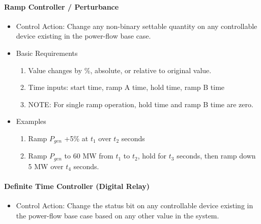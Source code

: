 \documentclass[12pt]{article}
\newcommand{\q}{(\textit{\textbf{?}})}
\begin{document}
\begin{multicols*}{2}
\paragraph{Ramp Controller / Perturbance}
\begin{itemize}
	\item Control Action: Change any non-binary settable quantity on any controllable device existing in the power-flow base case.
	\item Basic Requirements
	\begin{enumerate}
		\item Value changes by \%, absolute, or relative to original value.
		\item Time inputs: start time, ramp A time, hold time, ramp B time
		\item NOTE: For single ramp operation, hold time and ramp B time are zero.
	\end{enumerate}
	\item Examples
	\begin{enumerate}
	\item Ramp $P_{gen}$ +5\% at $t_1$ over $t_2$ seconds
	\item Ramp $P_{gen}$ to 60 MW from $t_1$ to $t_2$, hold for $t_3$ seconds, then ramp down 5 MW over $t_4$ seconds.
	\end{enumerate}	
	
\end{itemize}

\vfill\null
\columnbreak
%
\vspace{0pt}
\paragraph{Definite Time Controller (Digital Relay)}%
\begin{itemize}
	\item Control Action: Change the status bit on any controllable device existing in the power-flow base case based on any other value in the system.
	

\end{itemize}
\end{multicols*}
\end{document}
